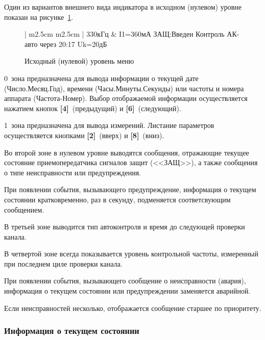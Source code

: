 Один из вариантов внешнего вида индикатора в исходном (нулевом) уровне показан на рисунке~\ref{fig:overview_level0}. 

\begin{figure}[H]
	\centering
	
	\begin{tabular}{| m{2.5cm}  m{2.5cm} |}
		\firsthline
		330кГц	& \raggedleft I1=360мА 				\tabularnewline 
		 {ЗАЩ:Введен Контроль}	\tabularnewline 
		 {АК-авто через 20:17}	\tabularnewline 
		 {Uk=20дБ}				\tabularnewline
		\lasthline
	\end{tabular} 
	
	\caption{Исходный (нулевой) уровень меню}
	\label{fig:overview_level0}
\end{figure}

0~зона предназначена для вывода информации о текущей дате (Число.Месяц.Год), времени (Часы.Минуты.Секунды) или частоты и номера аппарата (Частота-Номер). Выбор отображаемой информации осуществляется нажатием кнопок \textbf{[4]}~(предыдущий) и \textbf{[6]}~(следующий).

1~зона предназначена для вывода измерений. Листание параметров осуществляется кнопками \textbf{[2]}~(вверх) и \textbf{[8]}~(вниз).

Во второй зоне в нулевом уровне выводятся сообщения, отражающие текущее состояние приемопередатчика сигналов защит (<<ЗАЩ>>), а также сообщения о типе неисправности или предупреждения.

При появлении события, вызывающего предупреждение, информация о текущем состоянии кратковременно, раз в секунду, подменяется соответсвующим сообщением.

В третьей зоне выводится тип автоконтроля и время до следующей проверки канала.

В четвертой зоне всегда показывается уровень контрольной частоты, измеренный при последнем циле проверки канала.

При появлении события, вызывающего сообщение о неисправности (авария), информация о текущем состоянии или предупреждении заменяется аварийной.

Если неисправностей несколько, отображается сообщение старшее по приоритету.


\subsubsection{Информация о текущем состоянии}

